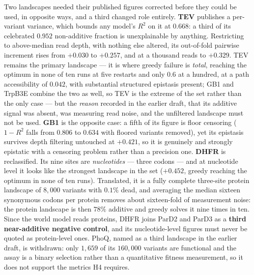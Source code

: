 \documentclass[12pt, a4paper]{article}
\begin{document}
Two landscapes needed their published figures corrected before they could be used, in opposite ways, and a third changed role entirely. \textbf{TEV} publishes a per-variant variance, which bounds any model's $R^2$ on it at $0.668$: a third of its celebrated $0.952$ non-additive fraction is unexplainable by anything. Restricting to above-median read depth, with nothing else altered, its out-of-fold pairwise increment rises from $+0.030$ to $+0.257$, and at a thousand reads to $+0.329$. TEV remains the primary landscape --- it is where greedy failure is \textit{total}, reaching the optimum in none of ten runs at five restarts and only $0.6$ at a hundred, at a path accessibility of $0.042$, with substantial structured epistasis present; GB1 and TrpB3E combine the two as well, so TEV is the extreme of the set rather than the only case --- but the \textit{reason} recorded in the earlier draft, that its additive signal was absent, was measuring read noise, and the unfiltered landscape must not be used. \textbf{GB1} is the opposite case: a fifth of its figure is floor censoring ($1 - R^2$ falls from $0.806$ to $0.634$ with floored variants removed), yet its epistasis survives depth filtering untouched at $+0.421$, so it is genuinely and strongly epistatic with a censoring problem rather than a precision one. \textbf{DHFR} is reclassified. Its nine sites are \textit{nucleotides} --- three codons --- and at nucleotide level it looks like the strongest landscape in the set ($+0.452$, greedy reaching the optimum in none of ten runs). Translated, it is a fully complete three-site protein landscape of $8{,}000$ variants with $0.1\%$ dead, and averaging the median sixteen synonymous codons per protein removes about sixteen-fold of measurement noise: the protein landscape is then $78\%$ additive and greedy solves it nine times in ten. Since the world model reads proteins, DHFR joins ParD2 and ParD3 as a \textbf{third near-additive negative control}, and its nucleotide-level figures must never be quoted as protein-level ones. PhoQ, named as a third landscape in the earlier draft, is withdrawn: only $1{,}659$ of its $160{,}000$ variants are functional and the assay is a binary selection rather than a quantitative fitness measurement, so it does not support the metrics H4 requires.
\end{document}
